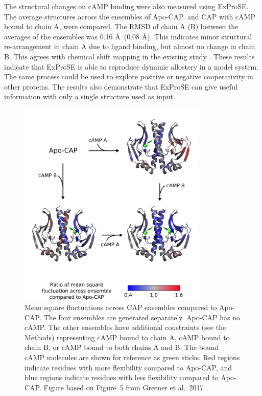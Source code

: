 The structural changes on cAMP binding were also measured using ExProSE.
The average structures across the ensembles of Apo-CAP, and CAP with cAMP bound to chain A, were compared.
The RMSD of chain A (B) between the averages of the ensembles was 0.16 \AA\ (0.08 \AA).
This indicates minor structural re-arrangement in chain A due to ligand binding, but almost no change in chain B.
This agrees with chemical shift mapping in the existing study \cite{Popovych2006}.
These results indicate that ExProSE is able to reproduce dynamic allostery in a model system.
The same process could be used to explore positive or negative cooperativity in other proteins.
The results also demonstrate that ExProSE can give useful information with only a single structure used as input.


\begin{figure}
\centering

\includegraphics[width=0.8\textwidth]{figures/cap/cap}

\caption[Mean square fluctuations across perturbed CAP ensembles compared to Apo-CAP]
{Mean square fluctuations across CAP ensembles compared to Apo-CAP.
The four ensembles are generated separately.
Apo-CAP has no cAMP.
The other ensembles have additional constraints (see the Methods) representing cAMP bound to chain A, cAMP bound to chain B, or cAMP bound to both chains A and B.
The bound cAMP molecules are shown for reference as green sticks.
Red regions indicate residues with more flexibility compared to Apo-CAP, and blue regions indicate residues with less flexibility compared to Apo-CAP.
Figure based on Figure~5 from Greener et al.\ 2017 \cite{Greener2017}.}

\label{fig:cap}
\end{figure}


